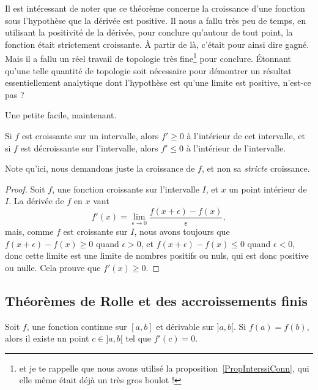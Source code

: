 Il est intéressant de noter que ce théorème concerne la croissance d'une fonction sous l'hypothèse que la dérivée est positive. Il nous a fallu très peu de temps, en utilisant la positivité de la dérivée, pour conclure qu'autour de tout point, la fonction était strictement croissante. À partir de là, c'était pour ainsi dire gagné. Mais il a fallu un réel travail de topologie très fine\footnote{et je te rappelle que nous avons utilisé la proposition~\ref{PropInterssiConn}, qui elle même était déjà un très gros boulot !} pour conclure. Étonnant qu'une telle quantité de topologie soit nécessaire pour démontrer un résultat essentiellement analytique dont l'hypothèse est qu'une limite est positive, n'est-ce pas ?

Une petite facile, maintenant.
\begin{proposition}
    Si $f$ est croissante sur un intervalle, alors $f'\geq 0$ à l'intérieur de cet intervalle, et si $f$ est décroissante sur l'intervalle, alors $f'\leq 0$ à l'intérieur de l'intervalle.
\end{proposition}

Note qu'ici, nous demandons juste la croissance de $f$, et non sa \emph{stricte} croissance.

\begin{proof}
    Soit $f$, une fonction croissante sur l'intervalle $I$, et $x$ un point intérieur de $I$. La dérivée de $f$ en $x$ vaut
    \begin{equation}
        f'(x)=\lim_{\epsilon\to 0}\frac{ f(x+\epsilon)-f(x) }{\epsilon},
    \end{equation}
    mais, comme $f$ est croissante sur $I$, nous avons toujours que $f(x+\epsilon)-f(x)\geq0$ quand $\epsilon>0$, et $f(x+\epsilon)-f(x)\leq0$ quand $\epsilon<0$, donc cette limite est une limite de nombres positifs ou nuls, qui est donc positive ou nulle. Cela prouve que $f'(x)\geq 0$.
\end{proof}

\subsection{Théorèmes de Rolle et des accroissements finis}

\begin{theorem}       \label{ThoRolle}
    Soit $f$, une fonction continue sur $[a,b]$ et dérivable sur $]a,b[$. Si $f(a)=f(b)$, alors il existe un point $c\in]a,b[$ tel que $f'(c)=0$.
\end{theorem}

